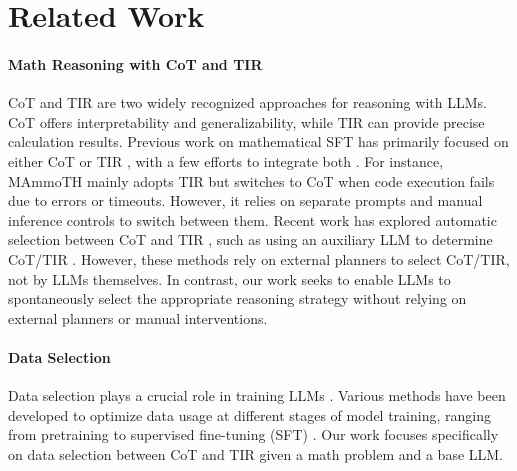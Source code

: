 \section{Related Work}\label{sec:related_work}

\paragraph{Math Reasoning with CoT and TIR}
CoT and TIR are two widely recognized approaches for reasoning with LLMs. 
CoT offers interpretability and generalizability, while TIR can provide precise calculation results.
Previous work on mathematical SFT has primarily focused on either CoT \citep{metamath2023yu, dartmath2024tong, deepseekmath2024shao, yan2024s} or TIR \citep{mammoth2023yue, tora2023Gou, mathcoder2023wang, mumathcode2024yin}, with a few efforts to integrate both \citep{mammoth2023yue, numinamath7b, Qwen25Math2024Yang}. 
For instance, MAmmoTH \citep{mammoth2023yue} mainly adopts TIR but switches to CoT when code execution fails due to errors or timeouts. 
However, it relies on separate prompts and manual inference controls to switch between them.  
Recent work has explored automatic selection between CoT and TIR \citep{automatictoolselect2023zhao, dots2024yue, toolteaching2024yu}, such as using an auxiliary LLM to determine CoT/TIR \citep{automatictoolselect2023zhao}. 
However, these methods rely on external planners to select CoT/TIR, not by LLMs themselves. 
In contrast, our work seeks to enable LLMs to spontaneously select the appropriate reasoning strategy without relying on external planners or manual interventions.


\paragraph{Data Selection}
Data selection plays a crucial role in training LLMs \citep{dataselectionsurvey2024albalak}. Various methods have been developed to optimize data usage at different stages of model training, ranging from pretraining \citep{GPT32020Brown, qurating2024wettig, rho12025lin} to supervised fine-tuning (SFT) \citep{1-shot2023li, gdig2024pan, less2024xia, lima2024zhou}.
Our work focuses specifically on data selection between CoT and TIR given a math problem and a base LLM.

